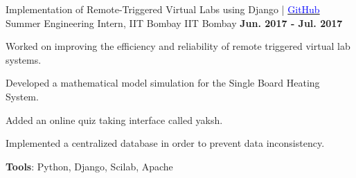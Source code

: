 \begin{cventries}
    \cventry
    {Implementation of Remote-Triggered Virtual Labs using Django | \href{https://github.com/shan18/SBHS-Vlabs}{\textcolor{Blue}{GitHub}}}
    {Summer Engineering Intern, IIT Bombay}
    {IIT Bombay}
    {\textbf{Jun. 2017 - Jul. 2017}}
    {
      \begin{cvitems}
        \item{Worked on improving the efficiency and reliability of remote triggered virtual lab systems.}
        \item{Developed a mathematical model simulation for the Single Board Heating System.}
        \item{Added an online quiz taking interface called yaksh.}
        \item{Implemented a centralized database in order to prevent data inconsistency.}
        \item{\textbf{Tools}: Python, Django, Scilab, Apache}
      \end{cvitems}
    }
\end{cventries}
